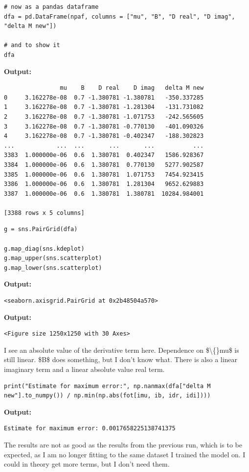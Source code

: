 \documentclass{article}
\begin{document}
\begin{lstlisting}
# now as a pandas dataframe
dfa = pd.DataFrame(npaf, columns = ["mu", "B", "D real", "D imag", "delta M new"])

# and to show it
dfa\end{lstlisting}

\textbf{Output:}\begin{verbatim}
                mu    B    D real    D imag   delta M new
0     3.162278e-08  0.7 -1.380781 -1.380781   -350.337285
1     3.162278e-08  0.7 -1.380781 -1.281304   -131.731082
2     3.162278e-08  0.7 -1.380781 -1.071753   -242.565605
3     3.162278e-08  0.7 -1.380781 -0.770130   -401.090326
4     3.162278e-08  0.7 -1.380781 -0.402347   -188.302823
...            ...  ...       ...       ...           ...
3383  1.000000e-06  0.6  1.380781  0.402347   1586.928367
3384  1.000000e-06  0.6  1.380781  0.770130   5277.902587
3385  1.000000e-06  0.6  1.380781  1.071753   7454.923415
3386  1.000000e-06  0.6  1.380781  1.281304   9652.629883
3387  1.000000e-06  0.6  1.380781  1.380781  10284.984001

[3388 rows x 5 columns]
\end{verbatim}

\begin{lstlisting}
g = sns.PairGrid(dfa)

g.map_diag(sns.kdeplot)
g.map_upper(sns.scatterplot)
g.map_lower(sns.scatterplot)
\end{lstlisting}

\textbf{Output:}\begin{verbatim}
<seaborn.axisgrid.PairGrid at 0x2b48504a570>
\end{verbatim}

\textbf{Output:}\begin{verbatim}
<Figure size 1250x1250 with 30 Axes>
\end{verbatim}

I see an absolute value of the derivative term here. Dependence on \$\textbackslash\{\}mu\$ is still linear. \$B\$ does something, but I don't know what. There is also a linear imaginary term and a linear absolute value real term.

\begin{lstlisting}
print("Estimate for maximum error:", np.nanmax(dfa["delta M new"].to_numpy()) / np.min(np.abs(fot[imu, ib, idr, idi])))\end{lstlisting}

\textbf{Output:}\begin{verbatim}
Estimate for maximum error: 0.0017658225138741375

\end{verbatim}

The results are not as good as the results from the previous run, which is to be expected, as I am no longer fitting to the same dataset I trained the model on. I could in theory get more terms, but I don't need them.
\end{document}
